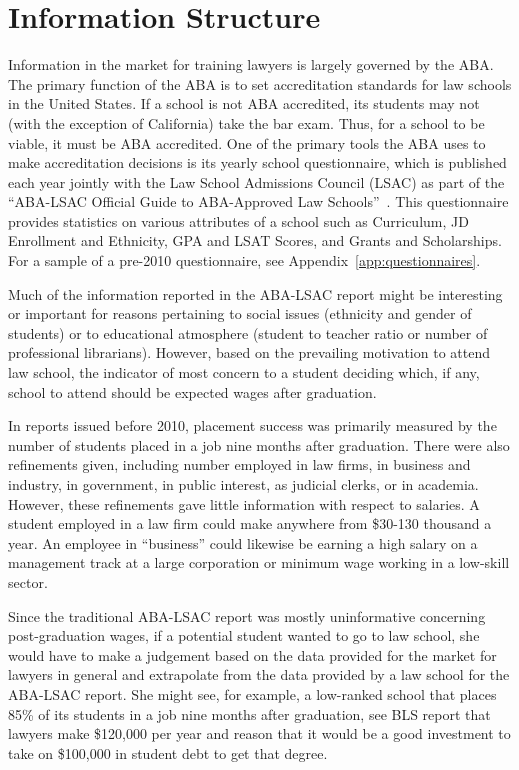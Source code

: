 \documentclass[12pt]{article}
\theoremstyle{definition}
\begin{document}
\section{Information Structure}
\label{sec:infostructure}
Information in the market for training lawyers is largely governed by the ABA. The primary function of the ABA is to set accreditation standards for law schools in the United States. If a school is not ABA accredited, its students may not (with the exception of California) take the bar exam. Thus, for a school to be viable, it must be ABA accredited. One of the primary tools the ABA uses to make accreditation decisions is its yearly school questionnaire, which is published each year jointly with the Law School Admissions Council (LSAC) as part of the ``ABA-LSAC Official Guide to ABA-Approved Law Schools''~\cite{LSAC}. This questionnaire provides statistics on various attributes of a school such as Curriculum, JD Enrollment and Ethnicity, GPA and LSAT Scores, and Grants and Scholarships. For a sample of a pre-2010 questionnaire, see Appendix~\ref{app:questionnaires}.

Much of the information reported in the ABA-LSAC report might be interesting or important for reasons pertaining to social issues (ethnicity and gender of students) or to educational atmosphere (student to teacher ratio or number of professional librarians). However, based on the prevailing motivation to attend law school, the indicator of most concern to a student deciding which, if any, school to attend should be expected wages after graduation.

In reports issued before 2010, placement success was primarily measured by the number of students placed in a job nine months after graduation. There were also refinements given, including number employed in law firms, in business and industry, in government, in public interest, as judicial clerks, or in academia. However, these refinements gave little information with respect to salaries. A student employed in a law firm could make anywhere from \$30-130 thousand a year. An employee in ``business'' could likewise be earning a high salary on a management track at a large corporation or minimum wage working in a low-skill sector.

Since the traditional ABA-LSAC report was mostly uninformative concerning post-graduation wages, if a potential student wanted to go to law school, she would have to make a judgement based on the data provided for the market for lawyers in general and extrapolate from the data provided by a law school for the ABA-LSAC report. She might see, for example, a low-ranked school that places 85\% of its students in a job nine months after graduation, see BLS report that lawyers make \$120,000 per year and reason that it would be a good investment to take on \$100,000 in student debt to get that degree.
\end{document}
